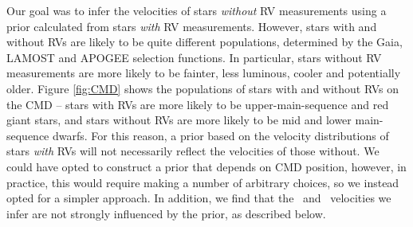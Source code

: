 Our goal was to infer the velocities of stars {\it without} RV measurements
using a prior calculated from stars {\it with} RV measurements.
However, stars with and without RVs are likely to be quite different
populations, determined by the Gaia, LAMOST and APOGEE selection functions.
In particular, stars without RV measurements are more likely to be fainter,
less luminous, cooler and potentially older.
Figure \ref{fig:CMD} shows the populations of stars with and without RVs on
the CMD -- stars with RVs are more likely to be upper-main-sequence and red
giant stars, and stars without RVs are more likely to be mid and lower
main-sequence dwarfs.
For this reason, a prior based on the velocity distributions of stars {\it
with} RVs will not necessarily reflect the velocities of those without.
We could have opted to construct a prior that depends on CMD position,
however, in practice, this would require making a number of arbitrary choices,
so we instead opted for a simpler approach.
In addition, we find that the \vx\ and \vz\ velocities we infer are not
strongly influenced by the prior, as described below.

